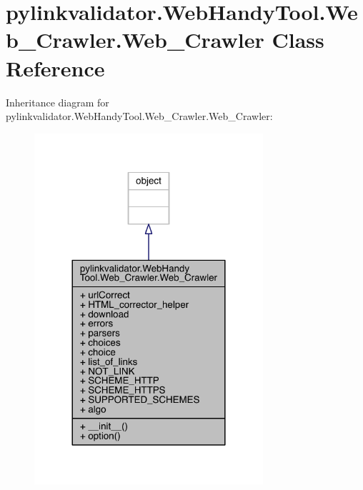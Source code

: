 \hypertarget{classpylinkvalidator_1_1_web_handy_tool_1_1_web___crawler_1_1_web___crawler}{}\section{pylinkvalidator.\+Web\+Handy\+Tool.\+Web\+\_\+\+Crawler.\+Web\+\_\+\+Crawler Class Reference}
\label{classpylinkvalidator_1_1_web_handy_tool_1_1_web___crawler_1_1_web___crawler}


Inheritance diagram for pylinkvalidator.\+Web\+Handy\+Tool.\+Web\+\_\+\+Crawler.\+Web\+\_\+\+Crawler\+:
\nopagebreak
\begin{figure}[H]
\begin{center}
\leavevmode
\includegraphics[width=240pt]{classpylinkvalidator_1_1_web_handy_tool_1_1_web___crawler_1_1_web___crawler__inherit__graph}
\end{center}
\end{figure}


